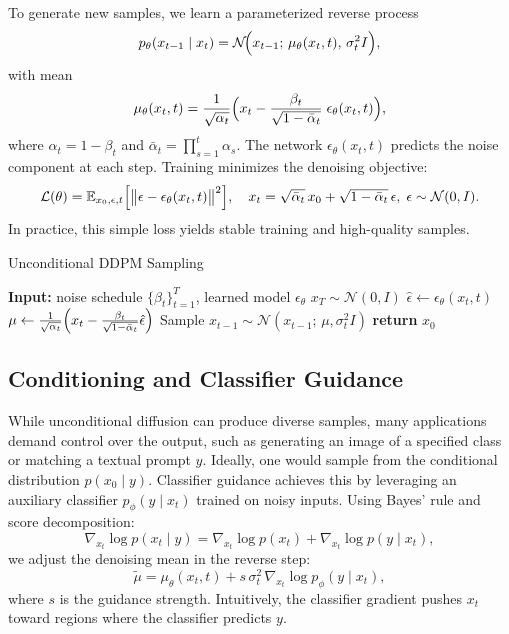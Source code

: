 \documentclass[11pt,a4paper]{article}
\begin{document}
To generate new samples, we learn a parameterized reverse process
\begin{equation}\label{eq:reverse}
p_\theta(x_{t-1}\mid x_t) 
= \mathcal{N}\!\Bigl(x_{t-1};\,\mu_\theta(x_t,t),\,\sigma_t^2 I\Bigr),
\end{equation}
with mean
\[
\mu_\theta(x_t,t)
=\frac{1}{\sqrt{\alpha_t}}\Bigl(x_t-\frac{\beta_t}{\sqrt{1-\bar\alpha_t}}\;\epsilon_\theta(x_t,t)\Bigr),
\]
where $\alpha_t = 1-\beta_t$ and $\bar\alpha_t = \prod_{s=1}^t \alpha_s$.  The network $\epsilon_\theta(x_t,t)$ predicts the noise component at each step.  Training minimizes the denoising objective:
\begin{equation}\label{eq:loss}
\mathcal{L}(\theta)
=\mathbb{E}_{x_0,\epsilon,t}\Bigl[\bigl\|\epsilon-\epsilon_\theta(x_t,t)\bigr\|^2\Bigr],\quad
x_t=\sqrt{\bar\alpha_t}\,x_0+\sqrt{1-\bar\alpha_t}\,\epsilon,\;\epsilon\sim\mathcal{N}(0,I).
\end{equation}
In practice, this simple loss yields stable training and high-quality samples.

\begin{algorithm}[htb]
\caption{Unconditional DDPM Sampling}\label{alg:ddpm}
\begin{algorithmic}[1]
  \STATE \textbf{Input:} noise schedule $\{\beta_t\}_{t=1}^T$, learned model $\epsilon_\theta$
  \STATE $x_T \sim \mathcal{N}(0,I)$
    \STATE $\hat\epsilon \leftarrow \epsilon_\theta(x_t,t)$
    \STATE $\mu \leftarrow \frac{1}{\sqrt{\alpha_t}}\Bigl(x_t - \tfrac{\beta_t}{\sqrt{1-\bar\alpha_t}}\hat\epsilon\Bigr)$
    \STATE Sample $x_{t-1}\sim \mathcal{N}(x_{t-1};\,\mu,\sigma_t^2 I)$
  \ENDFOR
  \STATE \textbf{return} $x_0$
\end{algorithmic}
\end{algorithm}

\subsection{Conditioning and Classifier Guidance}

While unconditional diffusion can produce diverse samples, many applications demand control over the output, such as generating an image of a specified class or matching a textual prompt $y$.  Ideally, one would sample from the conditional distribution $p(x_0\mid y)$.  Classifier guidance \cite{dhariwal2021diffusion} achieves this by leveraging an auxiliary classifier $p_\phi(y\!\mid\!x_t)$ trained on noisy inputs.  Using Bayes’ rule and score decomposition:
\[
\nabla_{x_t}\log p(x_t\mid y)
=\nabla_{x_t}\log p(x_t)
+\nabla_{x_t}\log p(y\mid x_t),
\]
we adjust the denoising mean in the reverse step:
\begin{equation}\label{eq:clf_guidance}
\tilde{\mu}
=\mu_\theta(x_t,t)
+ s\,\sigma_t^2\,\nabla_{x_t}\log p_\phi(y\mid x_t),
\end{equation}
where $s$ is the guidance strength.  Intuitively, the classifier gradient pushes $x_t$ toward regions where the classifier predicts $y$.
\end{document}
